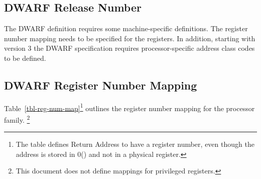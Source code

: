 \subsection{DWARF Release Number}

The DWARF definition requires some machine-specific definitions.
The register number mapping needs to be specified for the \xARCH
registers. In addition, starting with version 3 the DWARF specification
requires processor-specific address class codes to be defined.

\subsection{DWARF Register Number Mapping}

Table~\ref{tbl-reg-num-map}\footnote{The table defines Return Address
  to have a register number, even though the address is stored in
  0(\ESP) and not in a physical register.}  outlines the register
number mapping for the \xARCH processor family.%
\footnote{This document does not define mappings for privileged registers.}%

